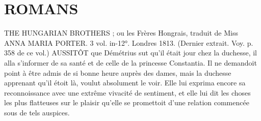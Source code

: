 \section{ROMANS}
THE HUNGARIAN BROTHERS ; ou les Frères Hongrais, traduit de Miss ANNA MARIA PORTER. 3 vol. in-12°. Londres 1813. (Dernier extrait. Voy. p. 358 de ce vol.)
AUSSITÔT que Démétrius sut qu'il était jour chez la duchesse, il alla s'informer de sa santé et de celle de la princesse Constantia. Il ne demandoit point à être admis de si bonne heure auprès des dames, mais la duchesse apprenant qu'il étoit là, voulut absolument le voir. Elle lui exprima encore sa reconnoissance avec une extrême vivacité de sentiment, et elle lui dit les choses les plus flatteuses sur le plaisir qu'elle se promettoit d'une relation commencée sous de tels auspices.